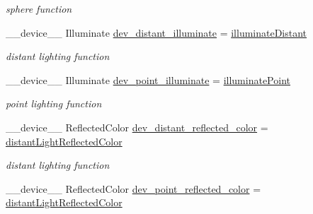 \begin{DoxyCompactItemize}
\begin{DoxyCompactList}\small\item\em sphere function \end{DoxyCompactList}\item 
\+\_\+\+\_\+device\+\_\+\+\_\+ Illuminate \hyperlink{group__device__pointers_ga29d3a70fa1f9d926548b068b7cda5d44}{dev\+\_\+distant\+\_\+illuminate} = \hyperlink{group__intersection__test__prperties_ga6a438778f6ed8683785d7a892a05d312}{illuminate\+Distant}\hypertarget{group__device__pointers_ga29d3a70fa1f9d926548b068b7cda5d44}{}\label{group__device__pointers_ga29d3a70fa1f9d926548b068b7cda5d44}

\begin{DoxyCompactList}\small\item\em distant lighting function \end{DoxyCompactList}\item 
\+\_\+\+\_\+device\+\_\+\+\_\+ Illuminate \hyperlink{group__device__pointers_ga9fb3abd281c9d4d00e477db4055e3111}{dev\+\_\+point\+\_\+illuminate} = \hyperlink{group__intersection__test__prperties_gab3c663df5b5a29d04083e7793bce50d5}{illuminate\+Point}\hypertarget{group__device__pointers_ga9fb3abd281c9d4d00e477db4055e3111}{}\label{group__device__pointers_ga9fb3abd281c9d4d00e477db4055e3111}

\begin{DoxyCompactList}\small\item\em point lighting function \end{DoxyCompactList}\item 
\+\_\+\+\_\+device\+\_\+\+\_\+ Reflected\+Color \hyperlink{group__device__pointers_ga3efd041b094f1b7a7c031d9c244a0630}{dev\+\_\+distant\+\_\+reflected\+\_\+color} = \hyperlink{group__intersection__test__prperties_ga19abb6bc50199d8583aafedd0e044b7e}{distant\+Light\+Reflected\+Color}\hypertarget{group__device__pointers_ga3efd041b094f1b7a7c031d9c244a0630}{}\label{group__device__pointers_ga3efd041b094f1b7a7c031d9c244a0630}

\begin{DoxyCompactList}\small\item\em distant lighting function \end{DoxyCompactList}\item 
\+\_\+\+\_\+device\+\_\+\+\_\+ Reflected\+Color \hyperlink{group__device__pointers_ga59eceb819291c7ca1e66b767a7253dc8}{dev\+\_\+point\+\_\+reflected\+\_\+color} = \hyperlink{group__intersection__test__prperties_ga19abb6bc50199d8583aafedd0e044b7e}{distant\+Light\+Reflected\+Color}\hypertarget{group__device__pointers_ga59eceb819291c7ca1e66b767a7253dc8}{}\label{group__device__pointers_ga59eceb819291c7ca1e66b767a7253dc8}


\end{DoxyCompactItemize}
